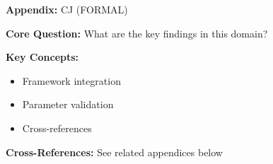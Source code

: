\begin{tcolorbox}[colback=blue!5!white, colframe=blue!75!black,
    title=Quick Reference: Appendix UNMAPPED_CJ]

\textbf{Appendix:} CJ (FORMAL)

\textbf{Core Question:} What are the key findings in this domain?

\textbf{Key Concepts:}
\begin{itemize}[nosep]
\item Framework integration
\item Parameter validation
\item Cross-references
\end{itemize}

\textbf{Cross-References:} See related appendices below
\end{tcolorbox}

\begin{abstract}

Sabatier's Advocacy Coalition Framework (ACF) distinguishes three hierarchical levels of belief: Deep Core (fundamental, non-falsifiable axioms), Policy Core (stable but negotiable commitments), and Secondary Beliefs (concrete, empirically adaptive instruments). This appendix applies ACF to social democracy, showing how the Austrian SPÖ's selective implementation of secondary beliefs (strong pensions, weak media regulation) while maintaining rhetorical commitment to policy core (market regulation) created fundamental incoherence. Babler's 2025 reform re-establishes consistency by implementing media regulation (Principle 8), thus re-connecting policy core to secondary beliefs.

\end{abstract}

